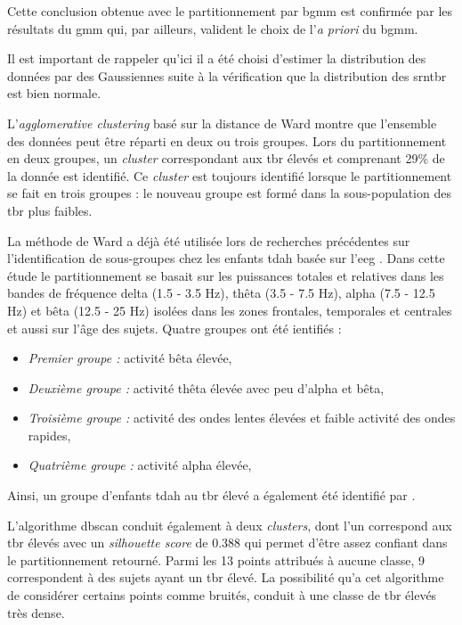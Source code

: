 Cette conclusion obtenue avec le partitionnement par \gls{bgmm} est confirmée par les résultats du \gls{gmm} qui, par ailleurs, valident le choix de 
l'\textit{a priori} du \gls{bgmm}. 

Il est important de rappeler qu'ici il a été choisi d'estimer la distribution des données par des Gaussiennes suite à la vérification que la distribution des 
\gls{srntbr} est bien normale.

L'\textit{agglomerative clustering} basé sur la distance de Ward montre que l'ensemble des données peut être réparti 
en deux ou trois groupes. Lors du partitionnement en deux groupes, un \textit{cluster} correspondant aux \gls{tbr} élevés et comprenant 29\% de la donnée
est identifié. Ce \textit{cluster} est toujours identifié lorsque le partitionnement se fait en trois groupes : le nouveau groupe est formé dans la sous-population
des \gls{tbr} plus faibles. 

La méthode de Ward a déjà été utilisée lors de recherches 
précédentes sur l'identification de sous-groupes chez les enfants \gls{tdah} basée sur l'\gls{eeg} \citep{Clarke2011}. Dans cette étude le partitionnement
se basait sur les puissances totales et relatives dans les bandes de fréquence delta (1.5 - 3.5 Hz), thêta (3.5 - 7.5 Hz), alpha (7.5 - 12.5 Hz) et bêta 
(12.5 - 25 Hz) isolées dans les zones frontales, temporales et centrales et aussi sur l'âge des sujets. Quatre groupes ont été ientifiés : 
\begin{itemize}
\item \emph{Premier groupe :} activité bêta élevée,
\item \emph{Deuxième groupe :} activité thêta élevée avec peu d'alpha et bêta,
\item \emph{Troisième groupe :} activité des ondes lentes élevées et faible activité des ondes rapides,
\item \emph{Quatrième groupe :} activité alpha élevée,
\end{itemize}

Ainsi, un groupe d'enfants \gls{tdah} au \gls{tbr} élevé a également été identifié par \citet{Clarke2011}.

L'algorithme \gls{dbscan} conduit également à deux \textit{clusters}, dont l'un correspond aux \gls{tbr} élevés avec un \textit{silhouette score} de 0.388 
qui permet d'être assez confiant dans le partitionnement retourné. Parmi les 13 points attribués à 
aucune classe, 9 correspondent à des sujets ayant un \gls{tbr} élevé. La possibilité qu'a cet algorithme de considérer certains points comme bruités, conduit à
une classe de \gls{tbr} élevés très dense. 

